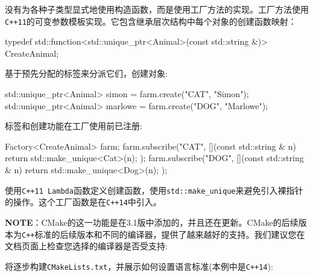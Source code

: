 没有为各种子类型显式地使用构造函数，而是使用工厂方法的实现。工厂方法使用\texttt{C++11}的可变参数模板实现。它包含继承层次结构中每个对象的创建函数映射：

\begin{codebox}[cpp]
typedef std::function<std::unique_ptr<Animal>(const
std::string &)> CreateAnimal;
\end{codebox}

基于预先分配的标签来分派它们，创建对象:

\begin{codebox}[cpp]
std::unique_ptr<Animal> simon = farm.create("CAT", "Simon");
std::unique_ptr<Animal> marlowe = farm.create("DOG", "Marlowe");
\end{codebox}

标签和创建功能在工厂使用前已注册:

\begin{codebox}[cpp]
Factory<CreateAnimal> farm;
farm.subscribe("CAT", [](const std::string & n) { return std::make_unique<Cat>(n); });
farm.subscribe("DOG", [](const std::string & n) { return std::make_unique<Dog>(n); });
\end{codebox}

使用\texttt{C++11 Lambda}函数定义创建函数，使用\texttt{std::make\_unique}来避免引入裸指针的操作。这个工厂函数是在\texttt{C++14}中引入。

\begin{myInfoBox}
\textbf{NOTE}：CMake的这一功能是在3.1版中添加的，并且还在更新。CMake的后续版本为\texttt{C++}标准的后续版本和不同的编译器，提供了越来越好的支持。我们建议您在文档页面上检查您选择的编译器是否受支持: 
\end{myInfoBox}


将逐步构建\texttt{CMakeLists.txt}，并展示如何设置语言标准(本例中是\texttt{C++14}):

